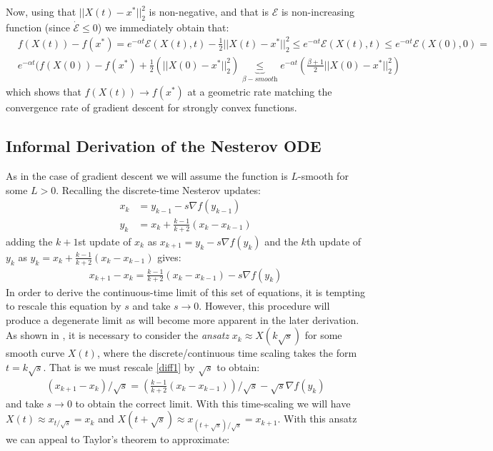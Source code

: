 Now, using that $||X(t)-x^*||_2^2$ is non-negative, and that is $\mathcal{E}$ is non-increasing function (since $\dot{\mathcal{E}} \leq 0$) we immediately obtain that:
\begin{align*}
    & f(X(t)) - f(x^*) = e^{-\alpha t} \mathcal{E}(X(t), t) - \frac{1}{2} ||X(t) - x^*||_2^2 \leq e^{-\alpha t} \mathcal{E}(X(t), t) \leq e^{-\alpha t} \mathcal{E}(X(0), 0) = \\
    & e^{-\alpha t} (f(X(0))-f(x^*)+\frac{1}{2}(||X(0)-x^*||_2^2) \underbrace{\leq}_{\beta-\textit{smooth}} e^{-\alpha t} \left( \frac{\beta+1}{2} ||X(0) - x^*||_2^2 \right) 
\end{align*}
which shows that $f(X(t)) \to f(x^*)$ at a geometric rate matching the convergence rate of gradient descent for strongly convex functions.

\subsection{Informal Derivation of the Nesterov ODE}
As in the case of gradient descent we will assume the function is $L$-smooth for some $L > 0$. Recalling the discrete-time Nesterov updates:
\begin{align}
    x_k &= y_{k-1} - s \nabla f(y_{k-1})\\
    y_k &= x_k + \frac{k-1}{k+2} (x_k - x_{k-1}) \label{nesterov}
\end{align}
adding the $k+1$st update of $x_k$ as $x_{k+1} = y_k - s \nabla f(y_k)$ and the $k$th update of $y_k$ as $y_k = x_k + \frac{k-1}{k+2}(x_k-x_{k-1})$ gives:
\begin{align}
    x_{k+1} - x_{k} = \frac{k-1}{k+2}(x_{k}-x_{k-1}) - s \nabla f(y_k) \label{diff1}
\end{align}
In order to derive the continuous-time limit of this set of equations, it is tempting to rescale this equation by $s$ and take $s \to 0$. However, this procedure will produce a degenerate limit as will become more apparent in the later derivation. As shown in \cite{su2014differential}, it is necessary to consider the \textit{ansatz} $x_k \approx X(k \sqrt{s})$ for some smooth curve $X(t)$, where the discrete/continuous time scaling takes the form $t = k \sqrt{s}$. That is we must rescale \eqref{diff1} by $\sqrt{s}$ to obtain:
\begin{align}
    (x_{k+1} - x_{k})/\sqrt{s} = \left(\frac{k-1}{k+2}(x_{k}-x_{k-1}) \right)/\sqrt{s} - \sqrt{s} \nabla f(y_k) \label{diff2}
\end{align}
and take $s \to 0$ to obtain the correct limit. With this time-scaling we will have $X(t) \approx x_{t/\sqrt{s}} = x_k$ and $X(t+ \sqrt{s}) \approx x_{(t+\sqrt{s})/\sqrt{s}} = x_{k+1}$. With this ansatz we can appeal to Taylor's theorem to approximate:
